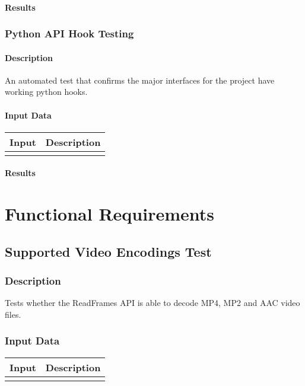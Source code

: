 \documentclass{scrreprt}
\begin{document}
\subsubsection{Results}

\subsection{Python API Hook Testing}
\subsubsection{Description}
\begin{flushleft}
An automated test that confirms the major interfaces for the project have working python hooks.
\end{flushleft}
\subsubsection{Input Data}
 \centering
 \begin{tabular}{p{3cm}p{6cm}}
 \hline\hline
 Input & Description\\
 \hline\hline
   &  \\ %
 \hline
 \end{tabular}
\subsubsection{Results}

\chapter{Functional Requirements}
\section{Supported Video Encodings Test}
\subsection{Description}
\begin{flushleft}
Tests whether the ReadFrames API is able to decode MP4, MP2 and AAC video files.
\end{flushleft}
\subsection{Input Data}
 \centering
 \begin{tabular}{p{3cm}p{6cm}}
 \hline\hline
 Input & Description\\
 \hline\hline
   &  \\ %
 \hline
 \end{tabular}
\end{document}
